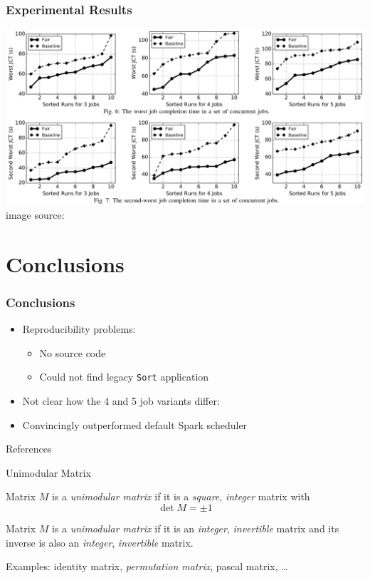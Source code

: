 \documentclass[presentation,professionalfonts]{beamer}
\begin{document}
\begin{frame}
  \frametitle{Experimental Results}
  \begin{center}
  \includegraphics[width=\textwidth]{main_result}\\
  image source: \textcite{Chen2017}
  \end{center}
\end{frame}

\section{Conclusions}

\begin{frame}
  \frametitle{Conclusions}
  \begin{itemize}
  \item Reproducibility problems:
    \begin{itemize}
    \item No source code
    \item Could not find legacy \texttt{Sort} application
    \end{itemize}
  \item Not clear how the 4 and 5 job variants differ:
  \item Convincingly outperformed default Spark scheduler
  \end{itemize}
\end{frame}


\begin{frame}[fragile]{References}
\printbibliography
\end{frame}

\appendix

\begin{frame}{Unimodular Matrix}
  \begin{definition}
    Matrix \(M\) is a \emph{unimodular matrix} if it is a \emph{square}, \emph{integer} matrix with \[\det M = \pm 1\]
  \end{definition}
  \begin{definition}
    Matrix \(M\) is a \emph{unimodular matrix} if it is an
    \emph{integer}, \emph{invertible} matrix and its inverse is also
    an \emph{integer}, \emph{invertible} matrix.
  \end{definition}
  Examples: identity matrix, \emph{permutation matrix}, pascal matrix, \dots
\end{frame}
\end{document}
